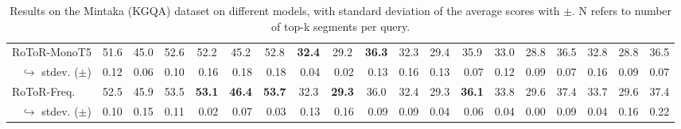 \begin{table*}[t]
{\begin{tabular}{@{}lcccccccccccccccccc@{}}
\multicolumn{1}{l|}{RoToR-MonoT5} & 51.6 & 45.0 & \multicolumn{1}{c|}{52.6} & 52.2 & 45.2 & \multicolumn{1}{c|}{52.8} & \textbf{32.4} & 29.2 & \multicolumn{1}{c|}{\textbf{36.3}} & 32.3 & 29.4 & \multicolumn{1}{c|}{35.9} & 33.0 & 28.8 & \multicolumn{1}{c|}{36.5} & 32.8 & 28.8 & 36.5 \\
\multicolumn{1}{r|}{$\hookrightarrow$ stdev. ($\pm$)} & \multicolumn{1}{r}{\small 0.12} & \multicolumn{1}{r}{\small 0.06} & \multicolumn{1}{r|}{\small 0.10} & \multicolumn{1}{r}{\small 0.16} & \multicolumn{1}{r}{\small 0.18} & \multicolumn{1}{r|}{\small 0.18} & \multicolumn{1}{r}{\small 0.04} & \multicolumn{1}{r}{\small 0.02} & \multicolumn{1}{r|}{\small 0.13} & \multicolumn{1}{r}{\small 0.16} & \multicolumn{1}{r}{\small 0.13} & \multicolumn{1}{r|}{\small 0.07} & \multicolumn{1}{r}{\small 0.12} & \multicolumn{1}{r}{\small 0.09} & \multicolumn{1}{r|}{\small 0.07} & \multicolumn{1}{r}{\small 0.16} & \multicolumn{1}{r}{\small 0.09} & \multicolumn{1}{r}{\small 0.07} \\
\multicolumn{1}{l|}{RoToR-Freq.} & 52.5 & 45.9 & \multicolumn{1}{c|}{53.5} & \textbf{53.1} & \textbf{46.4} & \multicolumn{1}{c|}{\textbf{53.7}} & 32.3 & \textbf{29.3} & \multicolumn{1}{c|}{36.0} & 32.4 & 29.3 & \multicolumn{1}{c|}{\textbf{36.1}} & 33.8 & 29.6 & \multicolumn{1}{c|}{37.4} & 33.7 & 29.6 & 37.4 \\
\multicolumn{1}{r|}{$\hookrightarrow$ stdev. ($\pm$)} & \multicolumn{1}{r}{\small 0.10} & \multicolumn{1}{r}{\small 0.15} & \multicolumn{1}{r|}{\small 0.11} & \multicolumn{1}{r}{\small 0.02} & \multicolumn{1}{r}{\small 0.07} & \multicolumn{1}{r|}{\small 0.03} & \multicolumn{1}{r}{\small 0.13} & \multicolumn{1}{r}{\small 0.16} & \multicolumn{1}{r|}{\small 0.09} & \multicolumn{1}{r}{\small 0.09} & \multicolumn{1}{r}{\small 0.04} & \multicolumn{1}{r|}{\small 0.06} & \multicolumn{1}{r}{\small 0.04} & \multicolumn{1}{r}{\small 0.00} & \multicolumn{1}{r|}{\small 0.09} & \multicolumn{1}{r}{\small 0.04} & \multicolumn{1}{r}{\small 0.16} & \multicolumn{1}{r}{\small 0.22} \\ \bottomrule
\end{tabular}
}
\caption{Results on the Mintaka (KGQA) dataset on different models, with standard deviation of the average scores with $\pm$. N refers to number of top-k segments per query.}
\label{table/kgqa}

\end{table*}
